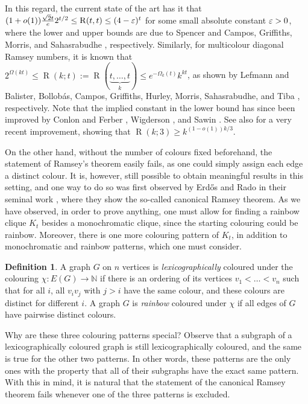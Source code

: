 \documentclass[10pt,a4paper]{article}
\theoremstyle{plain}
\theoremstyle{definition}
\newtheorem{definition}{Definition}
\newcommand{\N}{\mathbb{N}}
\renewcommand{\epsilon}{\ensuremath\varepsilon}
\begin{document}
In this regard, the current state of the art has it that $(1+o(1))\frac{\sqrt{2}t}{e}2^{t/2}\leq \operatorname{R}(t,t)\le (4-\epsilon)^t$ for some small absolute constant $\epsilon>0$, where the lower and upper bounds are due to Spencer \cite{spencer1977asymptotic} and Campos, Griffiths, Morris, and Sahasrabudhe \cite{campos2026exponential}, respectively. Similarly, for multicolour diagonal Ramsey numbers, it is known that $2^{\Omega(kt)}\le \operatorname{R}(k;t):=\operatorname{R}(\underbrace{t,\dots,t}_k)\le e^{-\Omega_k(t)}k^{kt}$, as shown by Lefmann \cite{lefmann1987note} and Balister, Bollob\'as, Campos, Griffiths, Hurley, Morris, Sahasrabudhe, and Tiba \cite{balister2026upper}, respectively. Note that the implied constant in the lower bound has since been improved by Conlon and Ferber \cite{conlon2021lower}, Wigderson \cite{wigderson2021improved}, and Sawin \cite{sawin2022improved}. See also \cite{OpenAI} for a very recent improvement, showing that $\operatorname{R}(k; 3)\geq k^{(1-o(1))k/3}$.

On the other hand, without the number of colours fixed beforehand, the statement of Ramsey's theorem easily fails, as one could simply assign each edge a distinct colour. It is, however, still possible to obtain meaningful results in this setting, and one way to do so was first observed by Erd\H{o}s and Rado in their seminal work \cite{erdos1950combinatorial}, where they show the so-called canonical Ramsey theorem. As we have observed, in order to prove anything, one must allow for finding a rainbow clique $K_t$ besides a monochromatic clique, since the starting colouring could be rainbow. Moreover, there is one more colouring pattern of $K_t$, in addition to monochromatic and rainbow patterns, which one must consider.

\begin{definition}\label{def-erado}
    A graph $G$ on $n$ vertices is \emph{lexicographically} coloured under the colouring $\chi:E(G)\to\N$ if there is an ordering of its vertices $v_1<\dots<v_n$ such that for all $i$, all $v_i v_j$ with $j>i$ have the same colour, and these colours are distinct for different $i$. A graph $G$ is \emph{rainbow} coloured under $\chi$ if all edges of $G$ have pairwise distinct colours.
\end{definition}

Why are these three colouring patterns special? Observe that a subgraph of a lexicographically coloured graph is still lexicographically coloured, and the same is true for the other two patterns. In other words, these patterns are the only ones with the property that all of their subgraphs have the exact same pattern. With this in mind, it is natural that the statement of the canonical Ramsey theorem fails whenever one of the three patterns is excluded.
\end{document}
